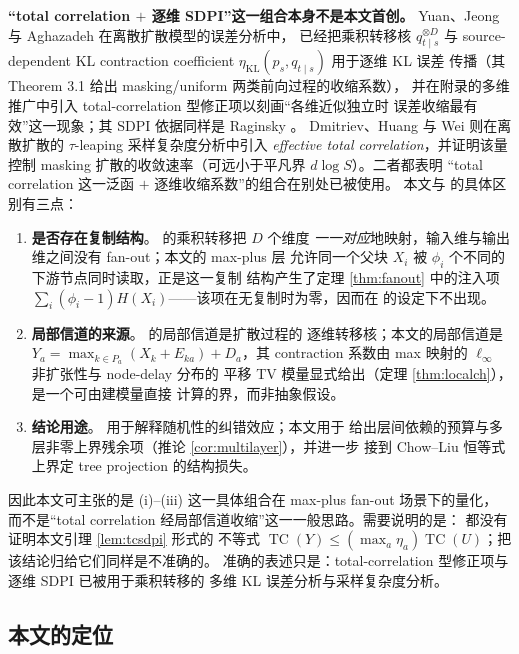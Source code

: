 \documentclass[a4paper,11pt]{article}
\theoremstyle{definition}
\newcommand{\1}{\mathbf 1}
\newcommand{\KL}{\mathrm{KL}}
\newcommand{\TC}{\operatorname{TC}}
\begin{document}
\textbf{“total correlation $+$ 逐维 SDPI”这一组合本身不是本文首创。}
Yuan、Jeong 与 Aghazadeh \cite{Yuan2026} 在离散扩散模型的误差分析中，
已经把乘积转移核 $q_{t\mid s}^{\otimes D}$ 与 source-dependent KL
contraction coefficient $\eta_{\KL}(p_s,q_{t\mid s})$ 用于逐维 KL 误差
传播（其 Theorem 3.1 给出 masking/uniform 两类前向过程的收缩系数），
并在附录的多维推广中引入 total-correlation 型修正项以刻画“各维近似独立时
误差收缩最有效”这一现象；其 SDPI 依据同样是 Raginsky \cite{Raginsky2016}。
Dmitriev、Huang 与 Wei \cite{Dmitriev2026} 则在离散扩散的 $\tau$-leaping
采样复杂度分析中引入 \emph{effective total correlation}，并证明该量控制
masking 扩散的收敛速率（可远小于平凡界 $d\log S$）。二者都表明
“total correlation 这一泛函 $+$ 逐维收缩系数”的组合在别处已被使用。
本文与 \cite{Yuan2026} 的具体区别有三点：
\begin{enumerate}[label=(\roman*)]
\item \textbf{是否存在复制结构}。\cite{Yuan2026} 的乘积转移把 $D$ 个维度
\emph{一一对应}地映射，输入维与输出维之间没有 fan-out；本文的 max-plus 层
允许同一个父块 $X_i$ 被 $\phi_i$ 个不同的下游节点同时读取，正是这一复制
结构产生了定理 \ref{thm:fanout} 中的注入项
$\sum_i(\phi_i-1)H(X_i)$——该项在无复制时为零，因而在 \cite{Yuan2026}
的设定下不出现。
\item \textbf{局部信道的来源}。\cite{Yuan2026} 的局部信道是扩散过程的
逐维转移核；本文的局部信道是 $Y_a=\max_{k\in P_a}(X_k+E_{ka})+D_a$，其
contraction 系数由 max 映射的 $\ell_\infty$ 非扩张性与 node-delay 分布的
平移 TV 模量显式给出（定理 \ref{thm:localch}），是一个可由建模量直接
计算的界，而非抽象假设。
\item \textbf{结论用途}。\cite{Yuan2026} 用于解释随机性的纠错效应；本文用于
给出层间依赖的预算与多层非零上界残余项（推论 \ref{cor:multilayer}），并进一步
接到 Chow--Liu 恒等式上界定 tree projection 的结构损失。
\end{enumerate}
因此本文可主张的是 (i)--(iii) 这一具体组合在 max-plus fan-out 场景下的量化，
而不是“total correlation 经局部信道收缩”这一一般思路。需要说明的是：
\cite{Yuan2026,Dmitriev2026} 都没有证明本文引理 \ref{lem:tcsdpi} 形式的
不等式 $\TC(Y)\le(\max_a\eta_a)\TC(U)$；把该结论归给它们同样是不准确的。
准确的表述只是：total-correlation 型修正项与逐维 SDPI 已被用于乘积转移的
多维 KL 误差分析与采样复杂度分析。

\subsection{本文的定位}
\label{sec:positioning}
\end{document}
